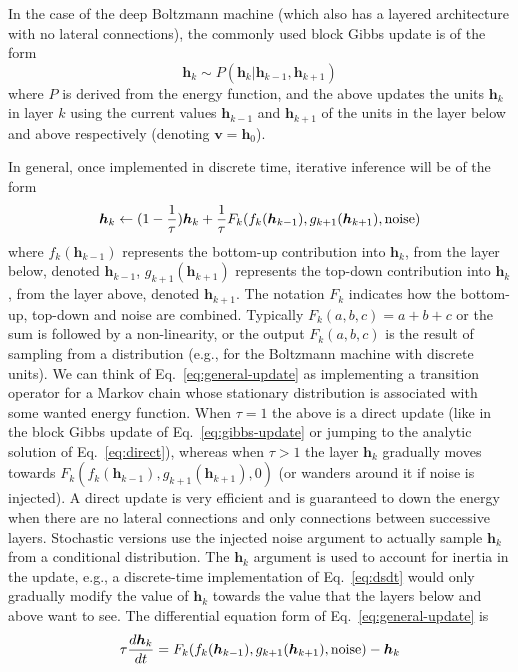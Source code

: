 \documentclass{article}
\newcommand   \vv{{\bm v}}
\newcommand   \vh{{\bm h}}
\begin{document}
In the case of the deep Boltzmann machine (which also has a layered architecture
with no lateral connections), the commonly used block Gibbs update is of the form
\begin{equation}
  \label{eq:gibbs-update}
  \vh_k \sim P(\vh_k | \vh_{k-1}, \vh_{k+1})
\end{equation}
where $P$ is derived from the energy function, and the above
updates the units $\vh_k$ in layer $k$ using the current values $\vh_{k-1}$ and $\vh_{k+1}$ of the
units in the layer below and above respectively (denoting $\vv=\vh_0$).

In general, once implemented in discrete time, iterative inference will be of the form
\begin{equation}
  \label{eq:general-update}
  \vh_k \leftarrow (1-\frac{1}{\tau}) \vh_k + \frac{1}{\tau} F_k(f_k(\vh_{k-1}),g_{k+1}(\vh_{k+1}),{\rm noise})
\end{equation}
where $f_k(\vh_{k-1})$ represents the bottom-up contribution into $\vh_k$, from the layer below, denoted $\vh_{k-1}$,
$g_{k+1}(\vh_{k+1})$ represents the top-down contribution into $\vh_k$, from the layer above, denoted $\vh_{k+1}$.
The notation $F_k$ indicates how the bottom-up, top-down and noise are combined. Typically $F_k(a,b,c)=a+b+c$
or the sum is followed by a non-linearity, or the output $F_k(a,b,c)$ is the result of sampling from a distribution
(e.g., for the Boltzmann machine with discrete units).
We can think of Eq.~\ref{eq:general-update} as implementing a transition operator for
a Markov chain whose stationary distribution is associated with some wanted energy function.
When $\tau=1$ the above is a direct update (like in the block Gibbs update of Eq.~\ref{eq:gibbs-update}
or jumping to the analytic solution of Eq.~\ref{eq:direct}), whereas when $\tau>1$ the layer $\vh_k$
gradually moves towards $F_k(f_k(\vh_{k-1}),g_{k+1}(\vh_{k+1}),0)$ (or wanders around it if noise is injected).
A direct update is very efficient and is guaranteed to down the energy when there are no lateral connections and only connections
between successive layers.
Stochastic versions use the injected noise argument to actually sample $\vh_k$ from a conditional
distribution. The $\vh_k$ argument is used to account for inertia in the update, e.g., a discrete-time
implementation of Eq.~\ref{eq:dsdt} would only gradually modify the value of $\vh_k$ towards the
value that the layers below and above want to see.
The differential equation form of Eq.~\ref{eq:general-update} is
\begin{equation}
  \label{eq:dhdt}
  \tau \frac{d\vh_k}{dt} = F_k(f_k(\vh_{k-1}),g_{k+1}(\vh_{k+1}),{\rm noise}) - \vh_k
\end{equation}
\end{document}
